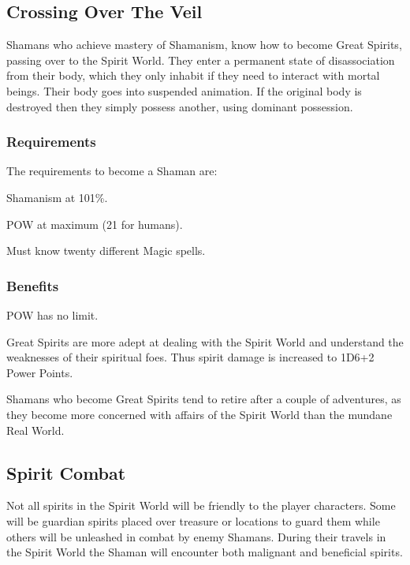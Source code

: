 \subsection{Crossing Over The Veil}
Shamans who achieve mastery of Shamanism, know how to become Great Spirits, passing over to the Spirit World. They enter a permanent state of disassociation from their body, which they only inhabit if they need to interact with mortal beings. Their body goes into suspended animation. If the original body is destroyed then they simply possess another, using dominant possession.

\subsubsection{Requirements}
The requirements to become a Shaman are:
\begin{rpg-list}
\item Shamanism at 101\%.
\item POW at maximum (21 for humans).
\item Must know twenty different Magic spells.
\end{rpg-list}

\subsubsection{Benefits}
\begin{rpg-list}
\item POW has no limit.
\item Great Spirits are more adept at dealing with the Spirit World and understand the weaknesses of their spiritual foes. Thus spirit damage is increased to 1D6+2 Power Points.
\end{rpg-list}

Shamans who become Great Spirits tend to retire after a couple of adventures, as they become more concerned with affairs of the Spirit World than the mundane Real World.


\subsection{Spirit Combat}
\label{ssec:spirit-combat}
Not all spirits in the Spirit World will be friendly to the player characters. Some will be guardian spirits placed over treasure or locations to guard them while others will be unleashed in combat by enemy Shamans. During their travels in the Spirit World the Shaman will encounter both malignant and beneficial spirits.

